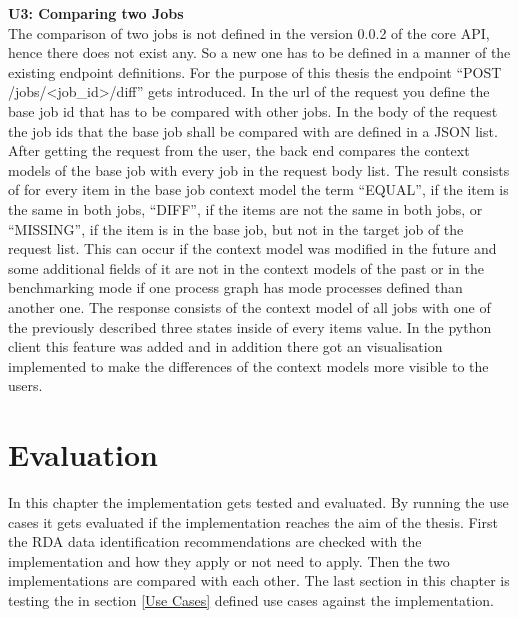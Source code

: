 \documentclass[draft,final]{vutinfth} %
\begin{document}
\textbf{U3: Comparing two Jobs} \\
The comparison of two jobs is not defined in the version 0.0.2 of the core API, hence there does not exist any. So a new one has to be defined in a manner of the existing endpoint definitions. For the purpose of this thesis the endpoint  “POST /jobs/<job\_id>/diff” gets introduced. In the url of the request you define the base job id that has to be compared with other jobs. In the body of the request the job ids that the base job shall be compared with are defined in a JSON list. After getting the request from the user, the back end compares the context models of the base job with every job in the request body list. The result consists of for every item in the base job context model the term “EQUAL”, if the item is the same in both jobs, “DIFF”, if the items are not the same in both jobs, or “MISSING”, if the item is in the base job, but not in the target job of the request list. This can occur if the context model was modified in the future and some additional fields of it are not in the context models of the past or in the benchmarking mode if one process graph has mode processes defined than another one. The response consists of the context model of all jobs with one of the previously described three states inside of every items value. In the python client this feature was added and in addition there got an visualisation implemented to make the differences of the context models more visible to the users.

\chapter{Evaluation}\label{Evaluation}
In this chapter the implementation gets tested and evaluated. By running the use cases it gets evaluated if the implementation reaches the aim of the thesis. First the RDA data identification recommendations are checked with the implementation and how they apply or not need to apply. Then the two implementations are compared with each other. The last section in this chapter is testing the in section \ref{Use Cases} defined use cases against the implementation. 
\end{document}
